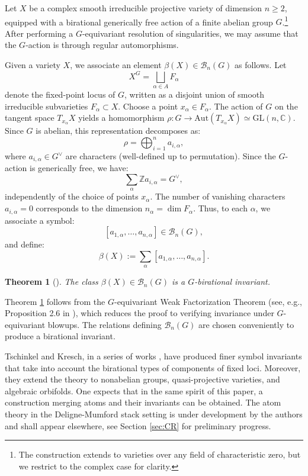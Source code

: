 \documentclass[12pt,a4paper]{amsart}
\newtheorem{theorem}{Theorem}[section]
\theoremstyle{definition}
\theoremstyle{remark}
\newcommand{\C}{\mathbb{C}}
\begin{document}
\medskip

Let \(X\) be a complex smooth irreducible projective variety of dimension \(n \geq 2\), equipped with a birational generically free action of a finite abelian group \(G\).\footnote{The construction extends to varieties over any field of characteristic zero, but we restrict to the complex case for clarity.} After performing a \(G\)-equivariant resolution of singularities, we may assume that the \(G\)-action is through regular automorphisms.

Given a variety \(X\), we associate an element \(\beta(X) \in \mathcal{B}_n(G)\) as follows. Let
\[
X^G = \bigsqcup_{\alpha \in A} F_\alpha
\]
denote the fixed-point locus of \(G\), written as a disjoint union of smooth irreducible subvarieties \(F_\alpha \subset X\). Choose a point \(x_\alpha \in F_\alpha\). The action of \(G\) on the tangent space \(T_{x_\alpha}X\) yields a homomorphism \(\rho: G \to \mathrm{Aut}(T_{x_\alpha}X)\simeq\mathrm{GL}(n,\C)\). Since \(G\) is abelian, this representation decomposes as:
\[
\rho = \bigoplus_{i=1}^n a_{i,\alpha},
\]
where \(a_{i,\alpha} \in G^{\vee}\) are characters (well-defined up to permutation).
Since the \(G\)-action is generically free, we have:
\[
\sum_{\alpha} \mathbb{Z} a_{i,\alpha} = G^{\vee},
\]
independently of the choice of points \(x_\alpha\). The number of vanishing characters \(a_{i,\alpha} = 0\) corresponds to the dimension \(n_\alpha = \dim F_\alpha\). Thus, to each \(\alpha\), we associate a symbol:
\[
[a_{1,\alpha}, \ldots, a_{n,\alpha}] \in \mathcal{B}_n(G),
\]
and define:
\[
\beta(X) := \sum_\alpha [a_{1,\alpha}, \ldots, a_{n,\alpha}].
\]

\begin{theorem}[\cite{kontsevich2021equivariant}]\label{thm:kontsevich-pestun-tschinkel}
The class \(\beta(X) \in \mathcal{B}_n(G)\) is a \(G\)-birational invariant.
\end{theorem}

Theorem \ref{thm:kontsevich-pestun-tschinkel} follows from the \(G\)-equivariant Weak Factorization Theorem (see, e.g., Proposition 2.6 in \cite{Kresch2022}), which reduces the proof to verifying invariance under \(G\)-equivariant blowups. The relations defining $\mathcal B_n(G)$ are chosen conveniently to produce a birational invariant.

Tschinkel and Kresch, in a series of works \cites{kresch2019birational, Kresch2022, Kresch2022-Representation, kresch2023birational, kresch2022burnside, Kresch-Tschinke-Structure-and-Operations}, have produced finer symbol invariants that take into account the birational types of components of fixed loci. Moreover, they extend the theory to nonabelian groups, quasi-projective varieties, and algebraic orbifolds. One expects that in the same spirit of this paper, a construction merging atoms and their invariants can be obtained. The atom theory in the Deligne-Mumford stack setting is under development by the authors and shall appear elsewhere, see Section \ref{sec:CR} for preliminary progress.
\end{document}
